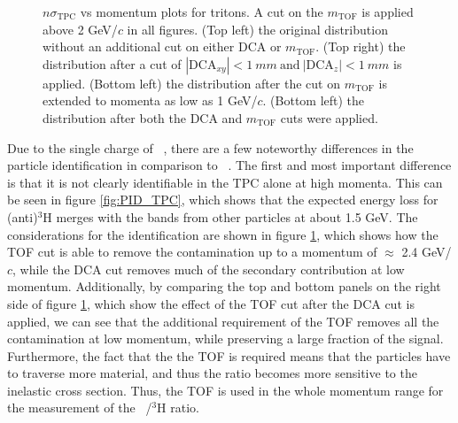 \begin{figure}
    \caption{$n\sigma_{\mathrm{TPC}}$ vs momentum plots for tritons. A cut on the $m_{\mathrm{TOF}}$ is applied above 2 GeV/$c$ in all figures. (Top left) the original distribution without an additional cut on either DCA or $m_{\mathrm{TOF}}$. (Top right) the distribution after a cut of $|\mathrm{DCA}_{xy}|<1\ mm\ \textrm{and}\  |\mathrm{DCA}_z|<1\ mm$ is applied. (Bottom left) the distribution after the cut on $m_{\mathrm{TOF}}$ is extended to momenta as low as 1 GeV/$c$. (Bottom left) the distribution after both the DCA and $m_{\mathrm{TOF}}$ cuts were applied.}
    \label{fig:Tritons_momentum_range}
\end{figure}
Due to the single charge of \atrit\ , there are a few noteworthy differences in the particle identification in comparison to \ahe\ . The first and most important difference is that it is not clearly identifiable in the TPC alone at high momenta. This can be seen in figure \ref{fig:PID_TPC}, which shows that the expected energy loss for (anti)$^3\mathrm{H}$ merges with the bands from other particles at about 1.5 GeV. The considerations for the identification are shown in figure \ref{fig:Tritons_momentum_range}, which shows how the TOF cut is able to remove the contamination up to a momentum of $\approx$ 2.4 GeV/$c$, while the DCA cut removes much of the secondary contribution at low momentum. Additionally, by comparing the top and bottom panels on the right side of figure \ref{fig:Tritons_momentum_range}, which show the effect of the TOF cut after the DCA cut is applied, we can see that the additional requirement of the TOF removes all the contamination at low momentum, while preserving a large fraction of the signal. Furthermore, the fact that the the TOF is required means that the particles have to traverse more material, and thus the ratio becomes more sensitive to the inelastic cross section. Thus, the TOF is used in the whole momentum range for the measurement of the \atrit\ /$^3\mathrm{H}$ ratio. 


